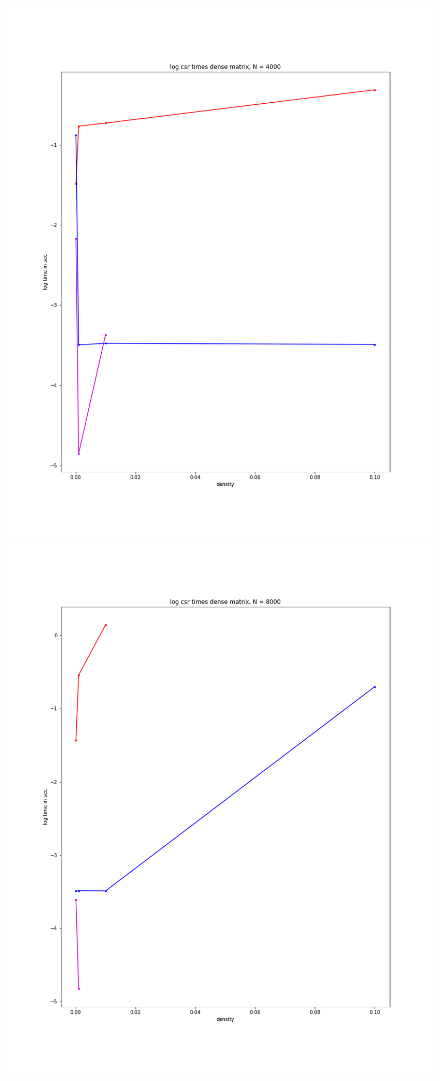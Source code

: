 \documentclass[12pt]{article}
\begin{document}
\begin{figure}[h]
  \includegraphics[scale = 0.16]{log_csr_dm_4000.png}
  \includegraphics[scale = 0.16]{log_csr_dm_8000.png}

\end{figure}
\end{document}
